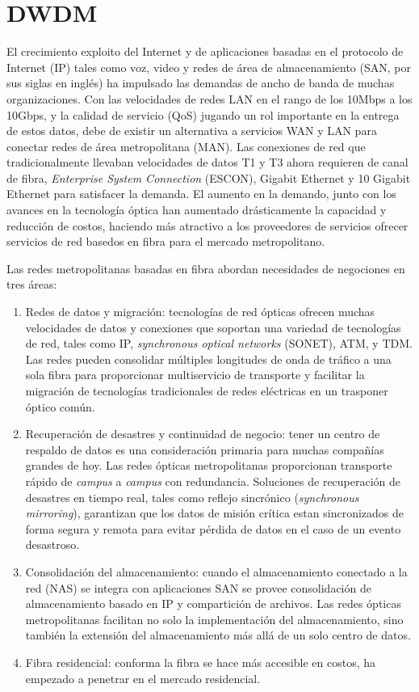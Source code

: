 \documentclass[10pt,journal,compsoc]{IEEEtran}
\begin{document}
\section{DWDM}
El crecimiento exploito del Internet y de aplicaciones basadas en el protocolo de Internet (IP) tales como voz, video y redes de área de almacenamiento (SAN, por sus siglas en inglés) ha impulsado las demandas de ancho de banda de muchas organizaciones. Con las velocidades de redes LAN en el rango de los 10Mbps a los 10Gbps, y la calidad de servicio (QoS) jugando un rol importante en la entrega de estos datos, debe de existir un alternativa a servicios WAN y LAN para conectar redes de área metropolitana (MAN). Las conexiones de red que tradicionalmente llevaban velocidades de datos \textsc{T1} y \textsc{T3} ahora requieren de canal de fibra, \emph{Enterprise System Connection} (ESCON), Gigabit Ethernet y 10 Gigabit Ethernet para satisfacer la demanda. El aumento en la demando, junto con los avances en la tecnología óptica han aumentado drásticamente la capacidad y reducción de costos, haciendo más atractivo a los proveedores de servicios ofrecer servicios de red basedos en fibra para el mercado metropolitano. 

Las redes metropolitanas basadas en fibra abordan necesidades de negociones en tres áreas:
\begin{enumerate}
    \item Redes de datos y migración: tecnologías de red ópticas ofrecen muchas velocidades de datos y conexiones que soportan una variedad de tecnologías de red, tales como IP, \emph{synchronous optical networks} (SONET), ATM, y TDM. Las redes pueden consolidar múltiples longitudes de onda de tráfico a una sola fibra para proporcionar multiservicio de transporte y facilitar la migración de tecnologías tradicionales de redes eléctricas en un trasponer óptico común.
    \item Recuperación de desastres y continuidad de negocio: tener un centro de respaldo de datos es una consideración primaria para muchas compañías grandes de hoy. Las redes ópticas metropolitanas proporcionan transporte rápido de \emph{campus} a \emph{campus} con redundancia. Soluciones de recuperación de desastres en tiempo real, tales como reflejo sincrónico (\emph{synchronous mirroring}), garantizan que los datos de misión crítica estan sincronizados de forma segura y remota para evitar pérdida de datos en el caso de un evento desastroso.
    \item Consolidación del almacenamiento: cuando el almacenamiento conectado a la red (NAS) se integra con aplicaciones SAN se provee consolidación de almacenamiento basado en IP y compartición de archivos. Las redes ópticas metropolitanas facilitan no solo la implementación del almacenamiento, sino también la extensión del almacenamiento más allá de un solo centro de datos. 
   \item Fibra residencial: conforma la fibra se hace más accesible en costos, ha empezado a penetrar en el mercado residencial.
\end{enumerate}
\end{document}
